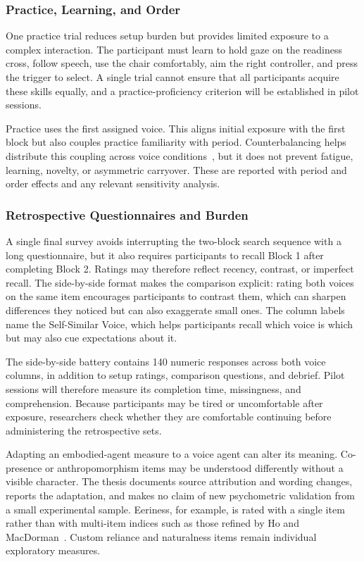 \subsubsection{Practice, Learning, and Order}
One practice trial reduces setup burden but provides limited exposure to a complex interaction. The participant must learn to hold gaze on the readiness cross, follow speech, use the chair comfortably, aim the right controller, and press the trigger to select. A single trial cannot ensure that all participants acquire these skills equally, and a practice-proficiency criterion will be established in pilot sessions.

Practice uses the first assigned voice. This aligns initial exposure with the first block but also couples practice familiarity with period. Counterbalancing helps distribute this coupling across voice conditions~\cite{williams1949residual}, but it does not prevent fatigue, learning, novelty, or asymmetric carryover. These are reported with period and order effects and any relevant sensitivity analysis.

\subsubsection{Retrospective Questionnaires and Burden}
A single final survey avoids interrupting the two-block search sequence with a long questionnaire, but it also requires participants to recall Block 1 after completing Block 2. Ratings may therefore reflect recency, contrast, or imperfect recall. The side-by-side format makes the comparison explicit: rating both voices on the same item encourages participants to contrast them, which can sharpen differences they noticed but can also exaggerate small ones. The column labels name the Self-Similar Voice, which helps participants recall which voice is which but may also cue expectations about it.

The side-by-side battery contains 140 numeric responses across both voice columns, in addition to setup ratings, comparison questions, and debrief. Pilot sessions will therefore measure its completion time, missingness, and comprehension. Because participants may be tired or uncomfortable after exposure, researchers check whether they are comfortable continuing before administering the retrospective sets.

Adapting an embodied-agent measure to a voice agent can alter its meaning. Co-presence or anthropomorphism items may be understood differently without a visible character. The thesis documents source attribution and wording changes, reports the adaptation, and makes no claim of new psychometric validation from a small experimental sample. Eeriness, for example, is rated with a single item rather than with multi-item indices such as those refined by Ho and MacDorman~\cite{homacdorman2017eeriness}. Custom reliance and naturalness items remain individual exploratory measures.

